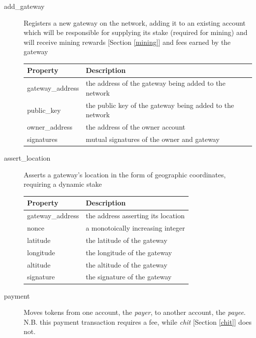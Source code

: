 \documentclass[10pt, nonatbib, nocopyrightspace, reprint]{sigplanconf}
\begin{document}
\begin{description}
  \item [add\_gateway] Registers a new gateway on the network, adding it to an existing account which will be responsible for supplying its stake (required for mining) and will receive mining rewards [Section \ref{mining}] and fees earned by the gateway

\begin{table}[H]
  \centering
  \begin{tabularx}{\columnwidth}{l X}
    \toprule
    Property & Description \\ \midrule
    gateway\_address & the address of the gateway being added to the network \\
    public\_key & the public key of the gateway being added to the network \\
    owner\_address & the address of the owner account \\
    signatures & mutual signatures of the owner and gateway
  \end{tabularx}
\end{table}

\item [assert\_location] Asserts a gateway's location in the form of geographic coordinates, requiring a dynamic stake

\begin{table}[H]
  \centering
  \begin{tabularx}{\columnwidth}{l X}
      \toprule
      Property & Description \\ \midrule
      gateway\_address & the address asserting its location \\
      nonce & a monotoically increasing integer \\
      latitude & the latitude of the gateway \\
      longitude & the longitude of the gateway \\
      altitude & the altitude of the gateway \\
      signature & the signature of the gateway
  \end{tabularx}
\end{table}

\item [payment] \label{payment} Moves tokens from one account, the \emph{payer}, to another account, the \emph{payee}. N.B. this payment transaction requires a fee, while \emph{chit} [Section \ref{chit}] does not.


\end{description}
\end{document}
